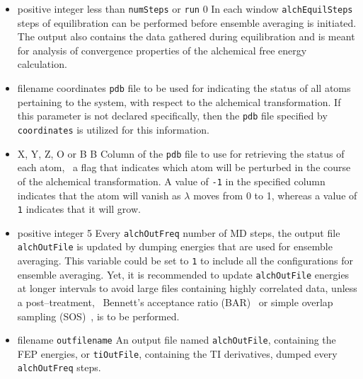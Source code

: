 \begin{itemize}
\item
{}
{positive integer less than {\tt numSteps} or {\tt run}}
{0}
{In each window {\tt alchEquilSteps} steps of equilibration can be
performed before ensemble averaging is initiated. The output also contains
the data gathered during equilibration and is meant for analysis of
convergence properties of the alchemical free energy calculation.}

\item
{}
{filename}
{coordinates}
{{\tt pdb} file to be used for indicating the status of all
atoms pertaining to the system, with respect to the alchemical transformation.
If this parameter is not declared specifically, then the
{\tt pdb} file specified by
{\tt coordinates} is utilized for this information.}

\item
{}
{X, Y, Z, O or B}
{B}
{Column of the {\tt pdb} file to use for retrieving the status
of each atom, \ie~a flag that indicates which atom will be perturbed
in the course of the alchemical transformation.
A value of {\tt -1} in the specified column indicates that the atom will
vanish as $\lambda$ moves from 0 to 1, whereas a value of {\tt 1}
indicates that it will grow.}

\item
{}
{positive integer}
{5}
{Every {\tt alchOutFreq} number of MD steps, the output file
{\tt alchOutFile} is updated by dumping energies that are
used for ensemble averaging.
This variable could be set to {\tt 1} to include all the
configurations for ensemble averaging. Yet, it is recommended
to update {\tt alchOutFile}  energies at longer intervals
to avoid large files containing highly correlated data, unless a post--treatment,
\eg~Bennett's acceptance ratio (BAR)~\cite{Bennett1976} or simple overlap
sampling (SOS)~\cite{Lu2004}, is to be performed.}

\item
{}
{filename}
{{\tt outfilename}}
{An output file named {\tt alchOutFile},
containing the FEP energies, or {\tt tiOutFile}, containing the TI derivatives, dumped every {\tt alchOutFreq} steps.}


\end{itemize}
